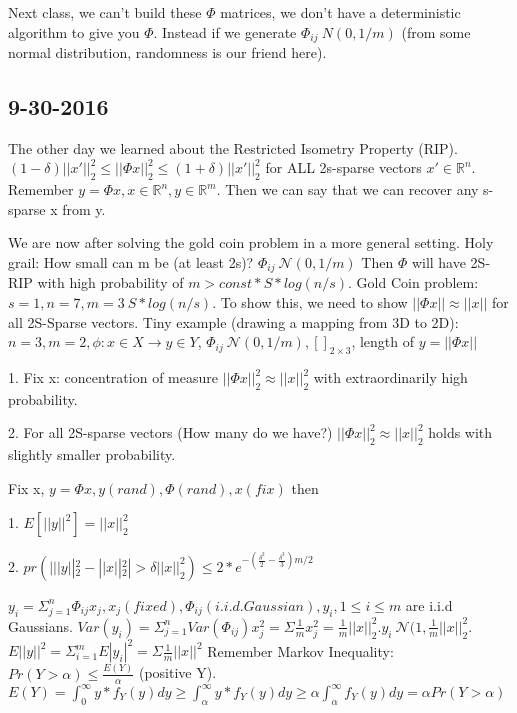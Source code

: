\documentclass[12pt,letterpaper]{report}
\begin{document}
Next class, we can't build these $\Phi$ matrices, we don't have a deterministic algorithm to give you $\Phi$.  Instead if we generate $\Phi_{ij} ~ N(0, 1/m)$ (from some normal distribution, randomness is our friend here).

\subsection*{9-30-2016}
The other day we learned about the Restricted Isometry Property (RIP). $(1 - \delta) ||x'||_2^2 \leq ||\Phi x||_2^2 \leq (1 + \delta) ||x'||_2^2$ for ALL 2s-sparse vectors $x' \in \mathbb{R}^n$.  Remember $y = \Phi x, x \in \mathbb{R}^n, y \in \mathbb{R}^m$.  Then we can say that we can recover any s-sparse x from y.

We are now after solving the gold coin problem in a more general setting.  Holy grail: How small can m be (at least 2s)? $\Phi_{ij} ~ \mathcal{N}(0, 1/m)$  Then $\Phi$ will have 2S-RIP with high probability of $m > const*S*log(n/s)$.  Gold Coin problem: $s=1, n=7, m=3 ~ S*log(n/s)$. To show this, we need to show $||\Phi x|| \approx ||x||$ for all 2S-Sparse vectors.  Tiny example (drawing a mapping from 3D to 2D): $n = 3, m = 2, \phi : x \in X \rightarrow y \in Y$, $\Phi_{ij} ~ \mathcal{N}(0, 1/m), []_{2 \times 3}$, length of $y = ||\Phi x||$

1. Fix x: concentration of measure $||\Phi x||_2^2 \approx ||x||_2^2$ with extraordinarily high probability.

2. For all 2S-sparse vectors (How many do we have?) $||\Phi x||_2^2 \approx ||x||_2^2$ holds with slightly smaller probability.

Fix x, $y = \Phi x, y (rand), \Phi (rand), x (fix)$ then

1. $E[||y||^2] = ||x||_2^2$

2. $pr(| ||y||_2^2 - ||x||_2^2 | > \delta ||x||_2^2) \leq 2*e^{-(\frac{\delta^2}{2} -\frac{\delta^3}{3})m/2}$

$y_i = \Sigma_{j=1}^n \Phi_{ij} x_j, x_j (fixed), \Phi_{ij} (i.i.d. Gaussian), y_i, 1 \leq i \leq m$ are i.i.d Gaussians.  $Var(y_i) = \Sigma_{j=1}^n Var(\Phi_{ij}) x_j^2 = \Sigma \frac{1}{m}x_j^2 = \frac{1}{m}||x||_2^2. y_i ~ \mathcal{N}(1, \frac{1}{m}||x||_2^2$.  $E||y||^2 = \Sigma_{i=1}^m E|y_i|^2 = \Sigma \frac{1}{m}||x||^2$  Remember Markov Inequality: $Pr(Y > \alpha) \leq \frac{E(Y)}{\alpha}$ (positive Y).  $E(Y) = \int_0^\infty y *f_Y(y)dy \geq \int_\alpha^\infty y *f_Y(y)dy \geq \alpha \int_\alpha^\infty f_Y(y)dy = \alpha Pr(Y>\alpha)$
\end{document}
